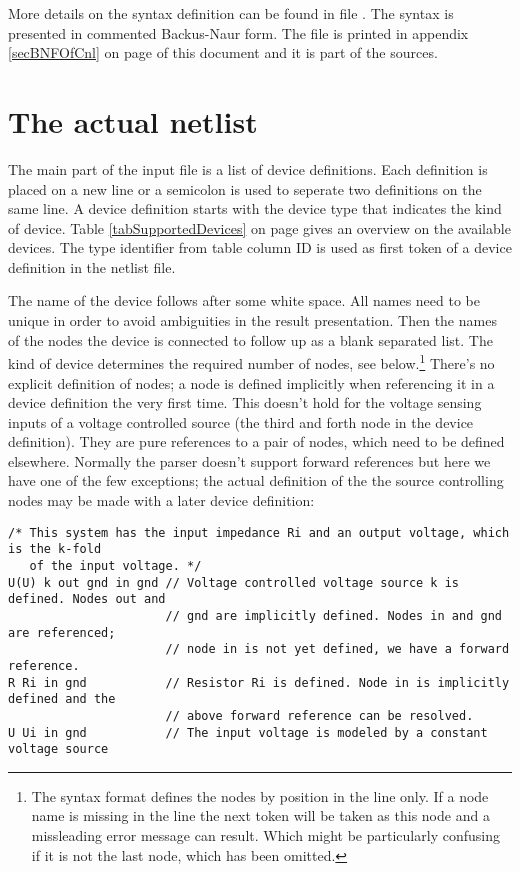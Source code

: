 More details on the syntax definition can be found in file
. The syntax is presented in commented
Backus-Naur form. The file is printed in appendix \ref{secBNFOfCnl} on
page \pageref{secBNFOfCnl} of this document and it is part of the
\linnet{} sources.


\section{The actual netlist}

The main part of the input file is a list of device definitions. Each
definition is placed on a new line or a semicolon is used to seperate two
definitions on the same line. A device definition starts with the device
type that indicates the kind of device. Table \ref{tabSupportedDevices} on
page \pageref{tabSupportedDevices} gives an overview on the available
devices. The type identifier from table column ID is used as first token
of a device definition in the netlist file.

The name of the device follows after some white space. All names need to
be unique in order to avoid ambiguities in the result presentation. Then
the names of the nodes the device is connected to follow up as a blank
separated list. The kind of device determines the required number of
nodes, see below.\footnote{The syntax format defines the nodes by position
in the line only. If a node name is missing in the line the next token
will be taken as this node and a missleading error message can result.
Which might be particularly confusing if it is not the last node, which
has been omitted.} There's no explicit definition of nodes; a node is
defined implicitly when referencing it in a device definition the very
first time. This doesn't hold for the voltage sensing inputs of a voltage
controlled source (the third and forth node in the device definition).
They are pure references to a pair of nodes, which need to be defined
elsewhere. Normally the parser doesn't support forward references but here
we have one of the few exceptions; the actual definition of the the source
controlling nodes may be made with a later device definition:

\begin{verbatim}
/* This system has the input impedance Ri and an output voltage, which is the k-fold
   of the input voltage. */
U(U) k out gnd in gnd // Voltage controlled voltage source k is defined. Nodes out and
                      // gnd are implicitly defined. Nodes in and gnd are referenced;
                      // node in is not yet defined, we have a forward reference.
R Ri in gnd           // Resistor Ri is defined. Node in is implicitly defined and the
                      // above forward reference can be resolved.
U Ui in gnd           // The input voltage is modeled by a constant voltage source
\end{verbatim}


